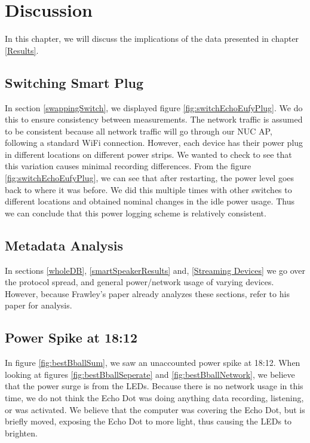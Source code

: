 \chapter{Discussion}
\label{Discussion}
In this chapter, we will discuss the implications of the data presented in chapter \ref{Results}.

\section{Switching Smart Plug}
In section \ref{swappingSwitch}, we displayed figure \ref{fig:switchEchoEufyPlug}. We do this to ensure consistency between measurements. The network traffic is assumed to be consistent because all network traffic will go through our NUC AP, following a standard WiFi connection. However, each device has their power plug in different locations on different power strips. We wanted to check to see that this variation causes minimal recording differences. From the figure \ref{fig:switchEchoEufyPlug}, we can see that after restarting, the power level goes back to where it was before. We did this multiple times with other switches to different locations and obtained nominal changes in the idle power usage. Thus we can conclude that this power logging scheme is relatively consistent.

\section{Metadata Analysis}
In sections \ref{wholeDB}, \ref{smartSpeakerResults} and, \ref{Streaming Devices} we go over the protocol spread, and general power/network usage of varying devices. However, because Frawley's paper \cite{frawley_2018} already analyzes these sections, refer to his paper for analysis.

\section{Power Spike at 18:12}
In figure \ref{fig:bestBballSum}, we saw an unaccounted power spike at 18:12. When looking at figures \ref{fig:bestBballSeperate} and \ref{fig:bestBballNetwork}, we believe that the power surge is from the LEDs. Because there is no network usage in this time, we do not think the Echo Dot was doing anything data recording, listening, or was activated. We believe that the computer was covering the Echo Dot, but is briefly moved, exposing the Echo Dot to more light, thus causing the LEDs to brighten.

